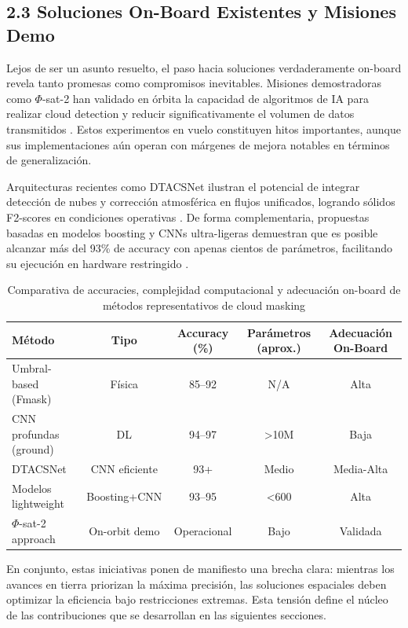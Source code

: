 \subsection{2.3 Soluciones On-Board Existentes y Misiones Demo}

Lejos de ser un asunto resuelto, el paso hacia soluciones verdaderamente on-board revela tanto promesas como compromisos inevitables. Misiones demostradoras como $\Phi$-sat-2 han validado en órbita la capacidad de algoritmos de IA para realizar cloud detection y reducir significativamente el volumen de datos transmitidos \cite{KP_Labs2024_PhiSat}. Estos experimentos en vuelo constituyen hitos importantes, aunque sus implementaciones aún operan con márgenes de mejora notables en términos de generalización.

Arquitecturas recientes como DTACSNet ilustran el potencial de integrar detección de nubes y corrección atmosférica en flujos unificados, logrando sólidos F2-scores en condiciones operativas \cite{Aybar2024_DTACSNet}. De forma complementaria, propuestas basadas en modelos boosting y CNNs ultra-ligeras demuestran que es posible alcanzar más del 93\% de accuracy con apenas cientos de parámetros, facilitando su ejecución en hardware restringido \cite{Ali2026_Lightweight}.

\begin{table}[h]
\centering
\caption{Comparativa de accuracies, complejidad computacional y adecuación on-board de métodos representativos de cloud masking}
\label{tab:comparison}
\begin{tabular}{lcccc}
\toprule
Método & Tipo & Accuracy (\%) & Parámetros (aprox.) & Adecuación On-Board \\
\midrule
Umbral-based (Fmask) & Física & 85--92 & N/A & Alta \\
CNN profundas (ground) & DL & 94--97 & >10M & Baja \\
DTACSNet \cite{Aybar2024_DTACSNet} & CNN eficiente & 93+ & Medio & Media-Alta \\
Modelos lightweight \cite{Ali2026_Lightweight} & Boosting+CNN & 93--95 & <600 & Alta \\
$\Phi$-sat-2 approach \cite{KP_Labs2024_PhiSat} & On-orbit demo & Operacional & Bajo & Validada \\
\bottomrule
\end{tabular}
\end{table}

En conjunto, estas iniciativas ponen de manifiesto una brecha clara: mientras los avances en tierra priorizan la máxima precisión, las soluciones espaciales deben optimizar la eficiencia bajo restricciones extremas. Esta tensión define el núcleo de las contribuciones que se desarrollan en las siguientes secciones.
